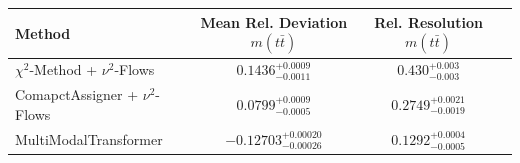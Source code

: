     \begin{tabular}{lccc}
        \toprule
        Method & Mean Rel. Deviation $m(t\bar{t})$ & Rel. Resolution $m(t\bar{t})$ \\
        \midrule
        $\chi^2$-Method + $\nu^2$-Flows & $0.1436^{+0.0009}_{-0.0011}$ & $0.430^{+0.003}_{-0.003}$ \\
        ComapctAssigner + $\nu^2$-Flows & $0.0799^{+0.0009}_{-0.0005}$ & $0.2749^{+0.0021}_{-0.0019}$ \\
        MultiModalTransformer & $-0.12703^{+0.00020}_{-0.00026}$ & $0.1292^{+0.0004}_{-0.0005}$ \\
        \bottomrule
    \end{tabular}